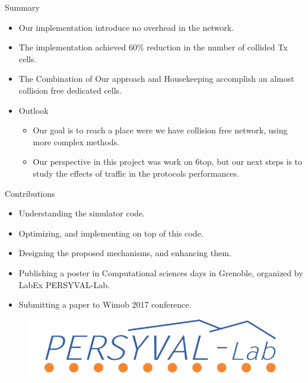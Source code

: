 \begin{withoutheadline}
\begin{frame}{Summary}
  \begin{itemize}
  \item
    Our implementation introduce  \alert{no overhead } in the network.
  \item
    The implementation \alert{achieved 60\% reduction} in the number of collided Tx cells.
  \item The Combination of Our approach and Housekeeping accomplish an \alert{ almost collision free dedicated cells}.
  \end{itemize}
  
  \begin{itemize}
  \item
    Outlook
    \begin{itemize}
    \item
     Our goal is to reach a place were we have collision free network, using more complex methods.
    \item
      Our perspective in this project was work on 6top, but our next steps is to study the effects of traffic in the protocols performances.
    \end{itemize}
  \end{itemize}
\end{frame}
\end{withoutheadline}


\begin{withoutheadline}
\begin{frame}{Contributions}
  \begin{itemize}
  \item Understanding the simulator code.
  \item Optimizing, and implementing on top of this code.
  \item Designing the proposed mechanisms, and enhancing them.
  \item Publishing a poster in Computational sciences days in Grenoble, organized by LabEx PERSYVAL-Lab.
  \item Submitting a paper to Wimob 2017 conference. 
  \end{itemize}
  \begin{figure}[p]
\centering
\includegraphics[width=.5\linewidth]{figures/per.png}

\end{figure}
\end{frame}
\end{withoutheadline}